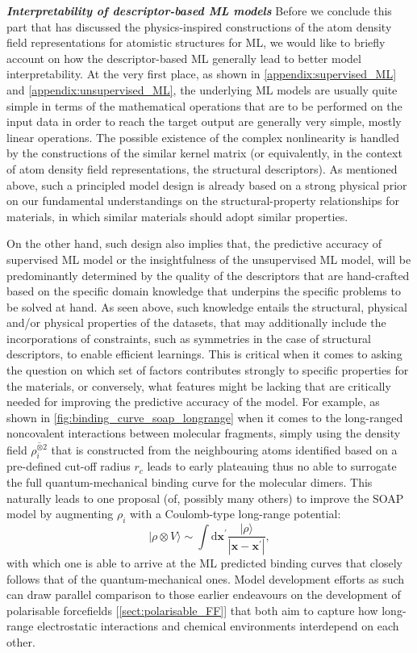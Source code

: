 \textbf{\emph{Interpretability of descriptor-based ML models}} Before we conclude this part that has discussed the physics-inspired constructions of the atom density field representations for atomistic structures for ML, we would like to briefly account on how the descriptor-based ML  generally lead to better model interpretability. At the very first place, as shown in \cref{appendix:supervised_ML} and \ref{appendix:unsupervised_ML}, the underlying ML models are usually quite simple in terms of the mathematical operations that are to be performed on the input data in order to reach the target output are generally very simple, mostly linear operations. The possible existence of the complex nonlinearity is handled by the constructions of the similar kernel matrix (or equivalently, in the context of atom density field representations, the structural descriptors). As mentioned above, such a principled model design is already based on a strong physical prior on our fundamental understandings on the structural-property relationships for materials, in which similar materials should adopt similar properties. 

On the other hand, such design also implies that, the predictive accuracy of supervised ML model or the insightfulness of the unsupervised ML model, will be predominantly determined by the quality of the descriptors that are hand-crafted based on the specific domain knowledge that underpins the specific problems to be solved at hand. As seen above, such knowledge entails the structural, physical and/or physical properties of the datasets, that may additionally include the incorporations of constraints, such as symmetries in the case of structural descriptors, to enable efficient learnings. This is critical when it comes to asking the question on which set of factors contributes strongly to specific properties for the materials, or conversely, what features might be lacking that are critically needed for improving the predictive accuracy of the model. For example, as shown in \cref{fig:binding_curve_soap_longrange} when it comes to the long-ranged noncovalent interactions between molecular fragments,\cite{grisafi2021multi} simply using the density field $\overline{\rho_i^{\otimes 2}}$ that is constructed from the neighbouring atoms identified based on a pre-defined cut-off radius $r_c$ leads to early plateauing thus no able to surrogate the full quantum-mechanical binding curve for the molecular dimers. This naturally leads to one proposal (of, possibly many others) to improve the SOAP model by augmenting $\rho_i$ with a Coulomb-type long-range potential:
\begin{equation*}
    |\rho\otimes V\rangle\sim\int \mathrm{d}\bm{x}^\prime \frac{|\rho\rangle}{|\bm{x}-\bm{x}^\prime|},
\end{equation*}
with which one is able to arrive at the ML predicted binding curves that closely follows that of the quantum-mechanical ones. Model development efforts as such can draw parallel comparison to those earlier endeavours on the development of polarisable forcefields [\cref{sect:polarisable_FF}] that both aim to capture how long-range electrostatic interactions and chemical environments interdepend on each other.

